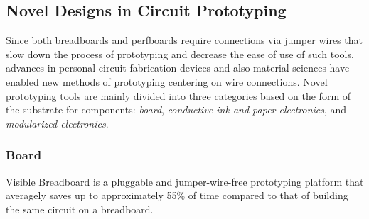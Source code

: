 \subsection{Novel Designs in Circuit Prototyping}

Since both breadboards and perfboards require connections via jumper wires that slow down the process of prototyping and decrease the ease of use of such tools, advances in personal circuit fabrication devices and also material sciences have enabled new methods of prototyping centering on wire connections.
Novel prototyping tools are mainly divided into three categories based on the form of the substrate for components: \textit{board}, \textit{conductive ink and paper electronics}, and \textit{modularized electronics}.

\subsubsection{Board}
Visible Breadboard \cite{Visible_Breadboard} is a pluggable and jumper-wire-free prototyping platform that averagely saves up to approximately 55\% of time compared to that of building the same circuit on a breadboard.

